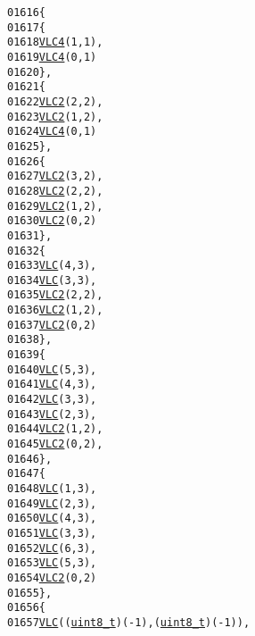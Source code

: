 \begin{footnotesize}
\begin{alltt}
01616 \{
01617         \{
01618                 \hyperlink{vlc_8h_a02cdc921d8f03450b12879e8afb222cb}{VLC4}(1, 1),
01619                 \hyperlink{vlc_8h_a02cdc921d8f03450b12879e8afb222cb}{VLC4}(0, 1)
01620         \},
01621         \{
01622                 \hyperlink{vlc_8h_ad3cda36b9c6132357c7f7de5e52a6c93}{VLC2}(2, 2),
01623                 \hyperlink{vlc_8h_ad3cda36b9c6132357c7f7de5e52a6c93}{VLC2}(1, 2),
01624                 \hyperlink{vlc_8h_a02cdc921d8f03450b12879e8afb222cb}{VLC4}(0, 1)
01625         \},
01626         \{
01627                 \hyperlink{vlc_8h_ad3cda36b9c6132357c7f7de5e52a6c93}{VLC2}(3, 2),
01628                 \hyperlink{vlc_8h_ad3cda36b9c6132357c7f7de5e52a6c93}{VLC2}(2, 2),
01629                 \hyperlink{vlc_8h_ad3cda36b9c6132357c7f7de5e52a6c93}{VLC2}(1, 2),
01630                 \hyperlink{vlc_8h_ad3cda36b9c6132357c7f7de5e52a6c93}{VLC2}(0, 2)
01631         \},
01632         \{
01633                 \hyperlink{vlc_8h_a7f3572774a720fd9b4bc3b1a0b65082f}{VLC}(4, 3),
01634                 \hyperlink{vlc_8h_a7f3572774a720fd9b4bc3b1a0b65082f}{VLC}(3, 3),
01635                 \hyperlink{vlc_8h_ad3cda36b9c6132357c7f7de5e52a6c93}{VLC2}(2, 2),
01636                 \hyperlink{vlc_8h_ad3cda36b9c6132357c7f7de5e52a6c93}{VLC2}(1, 2),
01637                 \hyperlink{vlc_8h_ad3cda36b9c6132357c7f7de5e52a6c93}{VLC2}(0, 2)
01638         \},
01639         \{
01640                 \hyperlink{vlc_8h_a7f3572774a720fd9b4bc3b1a0b65082f}{VLC}(5, 3),
01641                 \hyperlink{vlc_8h_a7f3572774a720fd9b4bc3b1a0b65082f}{VLC}(4, 3),
01642                 \hyperlink{vlc_8h_a7f3572774a720fd9b4bc3b1a0b65082f}{VLC}(3, 3),
01643                 \hyperlink{vlc_8h_a7f3572774a720fd9b4bc3b1a0b65082f}{VLC}(2, 3),
01644                 \hyperlink{vlc_8h_ad3cda36b9c6132357c7f7de5e52a6c93}{VLC2}(1, 2),
01645                 \hyperlink{vlc_8h_ad3cda36b9c6132357c7f7de5e52a6c93}{VLC2}(0, 2),
01646         \},
01647         \{
01648                 \hyperlink{vlc_8h_a7f3572774a720fd9b4bc3b1a0b65082f}{VLC}(1, 3),
01649                 \hyperlink{vlc_8h_a7f3572774a720fd9b4bc3b1a0b65082f}{VLC}(2, 3),
01650                 \hyperlink{vlc_8h_a7f3572774a720fd9b4bc3b1a0b65082f}{VLC}(4, 3),
01651                 \hyperlink{vlc_8h_a7f3572774a720fd9b4bc3b1a0b65082f}{VLC}(3, 3),
01652                 \hyperlink{vlc_8h_a7f3572774a720fd9b4bc3b1a0b65082f}{VLC}(6, 3),
01653                 \hyperlink{vlc_8h_a7f3572774a720fd9b4bc3b1a0b65082f}{VLC}(5, 3),
01654                 \hyperlink{vlc_8h_ad3cda36b9c6132357c7f7de5e52a6c93}{VLC2}(0, 2)
01655         \},
01656         \{
01657                 \hyperlink{vlc_8h_a7f3572774a720fd9b4bc3b1a0b65082f}{VLC}((\hyperlink{_types_8h_a363e4d606232036a6b89060813c45489}{uint8_t})(-1), (\hyperlink{_types_8h_a363e4d606232036a6b89060813c45489}{uint8_t})(-1)),

\end{alltt}
\end{footnotesize}
